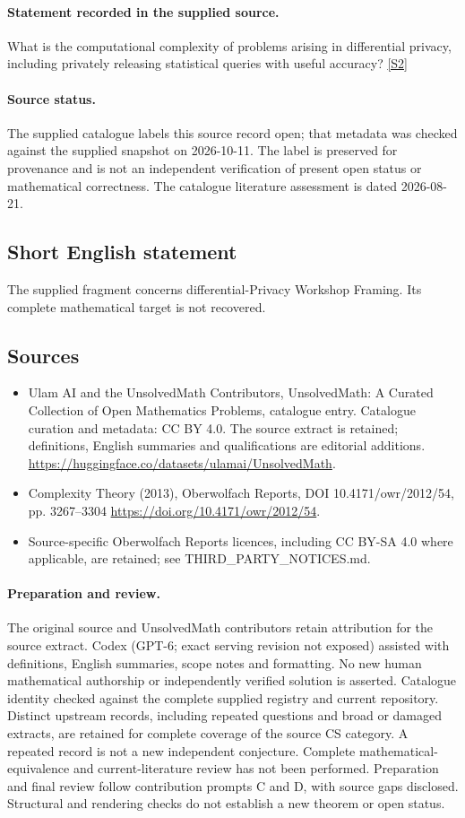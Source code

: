 \documentclass[11pt]{article}
\newcommand{\sref}[2]{\hyperlink{source:#1:#2}{[S#2]}}
\begin{document}
\paragraph{Statement recorded in the supplied source.}
What is the computational complexity of problems arising in differential privacy, including privately releasing statistical queries with useful accuracy? \sref{statement}{2}
\paragraph{Source status.}
The supplied catalogue labels this source record open; that metadata was checked against the supplied snapshot on 2026-10-11. The label is preserved for provenance and is not an independent verification of present open status or mathematical correctness. The catalogue literature assessment is dated 2026-08-21.
\subsection{Short English statement}
The supplied fragment concerns differential-Privacy Workshop Framing. Its complete mathematical target is not recovered.
\subsection{Sources}
\begin{itemize}
\item[\hypertarget{source:statement:1}{S1}] Ulam AI and the UnsolvedMath Contributors, UnsolvedMath: A Curated Collection of Open Mathematics Problems, catalogue entry. Catalogue curation and metadata: CC BY 4.0. The source extract is retained; definitions, English summaries and qualifications are editorial additions.
\url{https://huggingface.co/datasets/ulamai/UnsolvedMath}.
\item[\hypertarget{source:statement:2}{S2}] Complexity Theory (2013), Oberwolfach Reports, DOI 10.4171/owr/2012/54, pp. 3267--3304
\url{https://doi.org/10.4171/owr/2012/54}.
\item Source-specific Oberwolfach Reports licences, including CC BY-SA 4.0 where applicable, are retained; see THIRD\_PARTY\_NOTICES.md.
\end{itemize}
\paragraph{Preparation and review.}
The original source and UnsolvedMath contributors retain attribution for the source extract. Codex (GPT-6; exact serving revision not exposed) assisted with definitions, English summaries, scope notes and formatting. No new human mathematical authorship or independently verified solution is asserted. Catalogue identity checked against the complete supplied registry and current repository. Distinct upstream records, including repeated questions and broad or damaged extracts, are retained for complete coverage of the source CS category. A repeated record is not a new independent conjecture. Complete mathematical-equivalence and current-literature review has not been performed. Preparation and final review follow contribution prompts C and D, with source gaps disclosed. Structural and rendering checks do not establish a new theorem or open status.
\label{end:statement}
\end{document}
